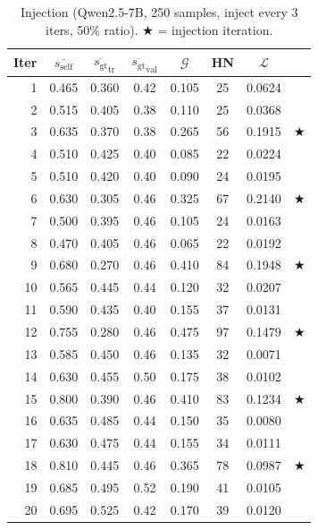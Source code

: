 \documentclass{article}
\newcommand{\gap}{\mathcal{G}}          %
\newcommand{\self}{s_{\text{self}}}     %
\newcommand{\gt}{s_{\text{gt}}}         %
\begin{document}
\begin{table}[h]
\centering
\caption{Injection (Qwen2.5-7B, 250 samples, inject every 3 iters, 50\% ratio). $\bigstar$ = injection iteration.}
\label{tab:app-injection}
\small
\begin{tabular}{rccccccl}
\toprule
Iter & $\overline{\self}$ & $\overline{\gt}_\text{tr}$ & $\overline{\gt}_\text{val}$ & $\gap$ & HN & $\mathcal{L}$ & \\
\midrule
1  & 0.465 & 0.360 & 0.42 & 0.105 & 25  & 0.0624 & \\
2  & 0.515 & 0.405 & 0.38 & 0.110 & 25  & 0.0368 & \\
3  & 0.635 & 0.370 & 0.38 & 0.265 & 56  & 0.1915 & $\bigstar$ \\
4  & 0.510 & 0.425 & 0.40 & 0.085 & 22  & 0.0224 & \\
5  & 0.510 & 0.420 & 0.40 & 0.090 & 24  & 0.0195 & \\
6  & 0.630 & 0.305 & 0.46 & 0.325 & 67  & 0.2140 & $\bigstar$ \\
7  & 0.500 & 0.395 & 0.46 & 0.105 & 24  & 0.0163 & \\
8  & 0.470 & 0.405 & 0.46 & 0.065 & 22  & 0.0192 & \\
9  & 0.680 & 0.270 & 0.46 & 0.410 & 84  & 0.1948 & $\bigstar$ \\
10 & 0.565 & 0.445 & 0.44 & 0.120 & 32  & 0.0207 & \\
11 & 0.590 & 0.435 & 0.40 & 0.155 & 37  & 0.0131 & \\
12 & 0.755 & 0.280 & 0.46 & 0.475 & 97  & 0.1479 & $\bigstar$ \\
13 & 0.585 & 0.450 & 0.46 & 0.135 & 32  & 0.0071 & \\
14 & 0.630 & 0.455 & 0.50 & 0.175 & 38  & 0.0102 & \\
15 & 0.800 & 0.390 & 0.46 & 0.410 & 83  & 0.1234 & $\bigstar$ \\
16 & 0.635 & 0.485 & 0.44 & 0.150 & 35  & 0.0080 & \\
17 & 0.630 & 0.475 & 0.44 & 0.155 & 34  & 0.0111 & \\
18 & 0.810 & 0.445 & 0.46 & 0.365 & 78  & 0.0987 & $\bigstar$ \\
19 & 0.685 & 0.495 & 0.52 & 0.190 & 41  & 0.0105 & \\
20 & 0.695 & 0.525 & 0.42 & 0.170 & 39  & 0.0120 & \\
\bottomrule
\end{tabular}
\end{table}
\end{document}
